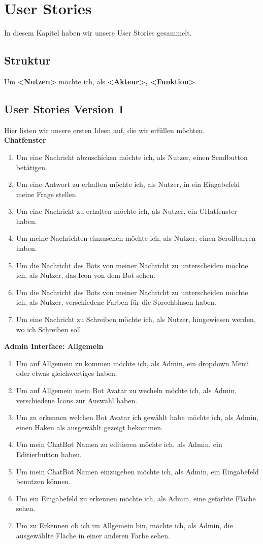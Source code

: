 \section{User Stories}
In diesem Kapitel haben wir unsere User Stories gesammelt.

\subsection{Struktur}
Um \textbf{<Nutzen>} möchte ich, als \textbf{<Akteur>, <Funktion>}.
\subsection{User Stories Version 1}
Hier listen wir unsere ersten Ideen auf, die wir erfüllen möchten.
\\

\textbf{Chatfenster}
\begin{enumerate}
    \item Um eine Nachricht abzuschicken möchte ich, als Nutzer, einen Sendbutton betätigen.
    \item Um eine Antwort zu erhalten möchte ich, als Nutzer, in ein Eingabefeld meine Frage stellen.
    \item Um eine Nachricht zu erhalten möchte ich, als Nutzer, ein CHatfenster haben.
    \item Um meine Nachrichten einzusehen möchte ich, als Nutzer, einen Scrollbarren haben.
    \item Um die Nachricht des Bots von meiner Nachricht zu unterscheiden möchte ich, als Nutzer, das Icon von dem Bot sehen.
    \item Um die Nachricht des Bots von meiner Nachricht zu unterscheiden möchte ich, als Nutzer, verschiedene Farben für die Sprechblasen haben.
    \item Um eine Nachricht zu Schreiben möchte ich, als Nutzer, hingewiesen werden, wo ich Schreiben soll.
\end{enumerate}

\textbf{Admin Interface: Allgemein}
\begin{enumerate}
    \item Um auf Allgemein zu kommen möchte ich, als Admin, ein dropdown Menü oder etwas gleichwertiges haben.
    \item Um auf Allgemein mein Bot Avatar zu wecheln möchte ich, als Admin, verschiedene Icons zur Auswahl haben.
    \item Um zu erkennen welchen Bot Avatar ich gewählt habe möchte ich, als Admin, einen Haken als ausgewählt gezeigt bekommen.
    \item Um mein ChatBot Namen zu editieren möchte ich, als Admin, ein Editierbutton haben.
    \item Um mein ChatBot Namen einzugeben möchte ich, als Admin, ein Eingabefeld benutzen können.
    \item Um ein Eingabefeld zu erkennen möchte ich, als Admin, eine gefärbte Fläche sehen.
    \item Um zu Erkennen ob ich im Allgemein bin, möchte ich, als Admin, die ausgewählte Fläche in einer anderen Farbe sehen.
\end{enumerate}

